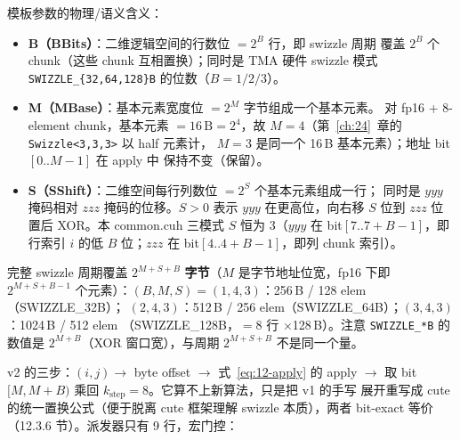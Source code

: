 模板参数的物理/语义含义：

\begin{itemize}
  \item \textbf{B（BBits）}：二维逻辑空间的行数位 $= 2^B$ 行，即 swizzle 周期
        覆盖 $2^B$ 个 chunk（这些 chunk 互相置换）；同时是 TMA 硬件 swizzle
        模式 \texttt{SWIZZLE\_\{32,64,128\}B} 的位数（$B=1/2/3$）。
  \item \textbf{M（MBase）}：基本元素宽度位 $= 2^M$ 字节组成一个基本元素。
        对 fp16 + 8-element chunk，基本元素 $= 16\,\mathrm{B} = 2^4$，故
        $M=4$（第~\ref{ch:24}~章的
        \texttt{Swizzle\allowbreak{}<3,\allowbreak{}3,\allowbreak{}3>} 以 half 元素计，
        $M{=}3$ 是同一个 16\,B 基本元素）；地址 bit$[0..M{-}1]$ 在 apply 中
        保持不变（保留）。
  \item \textbf{S（SShift）}：二维空间每行列数位 $= 2^S$ 个基本元素组成一行；
        同时是 $\mathit{yyy}$ 掩码相对 $\mathit{zzz}$ 掩码的位移。$S>0$ 表示
        $\mathit{yyy}$ 在更高位，向右移 $S$ 位到 $\mathit{zzz}$ 位置后 XOR。本
        common.cuh 三模式 $S$ 恒为 3（$\mathit{yyy}$ 在 bit$[7..7{+}B{-}1]$，即行索引
        $i$ 的低 $B$ 位；$\mathit{zzz}$ 在 bit$[4..4{+}B{-}1]$，即列 chunk 索引）。
\end{itemize}

完整 swizzle 周期覆盖 $2^{M+S+B}$ \textbf{字节}（$M$ 是字节地址位宽，fp16 下即
$2^{M+S+B-1}$ 个元素）：$(B,M,S)=(1,4,3)$：256\,B / 128 elem（SWIZZLE\_32B）；
$(2,4,3)$：512\,B / 256 elem（SWIZZLE\_64B）；$(3,4,3)$：1024\,B / 512 elem
（SWIZZLE\_128B，$=8$ 行 $\times$128\,B）。注意 \texttt{SWIZZLE\_*B} 的数值是
$2^{M+B}$（XOR 窗口宽），与周期 $2^{M+S+B}$ 不是同一个量。





v2 的三步：$(i,j)\to$ byte offset $\to$ 式~\ref{eq:12-apply} 的 apply $\to$ 取
bit $[M,M{+}B)$ 乘回 $k_{\mathrm{step}}{=}8$。它算不上新算法，只是把 v1 的手写
展开重写成 cute 的统一置换公式（便于脱离 cute 框架理解 swizzle 本质），两者
bit-exact 等价（12.3.6 节）。派发器只有 9 行，宏门控：



